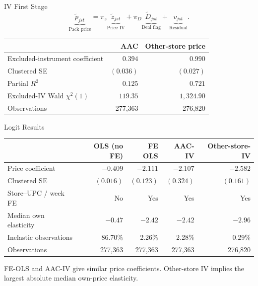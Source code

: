 \documentclass[aspectratio=169,11pt]{beamer}
\begin{document}
\begin{frame}{IV First Stage}
\[\underbrace{\widetilde p_{jst}}_{\text{Pack price}} =
\pi_z\underbrace{\widetilde z_{jst}}_{\text{Price IV}} +
\pi_D\underbrace{\widetilde D_{jst}}_{\text{Deal flag}} +
\underbrace{v_{jst}}_{\text{Residual}}.\]
\small\centering\renewcommand\arraystretch{1.10}
\begin{tabular}{@{}lrr@{}}
\toprule
 & AAC & Other-store price \\
\midrule
Excluded-instrument coefficient & $0.394$ & $0.990$ \\
Clustered SE & $(0.036)$ & $(0.027)$ \\
\midrule
Partial $R^2$ & $0.125$ & $0.721$ \\
Excluded-IV Wald $\chi^2(1)$ & $119.35$ & $1{,}324.90$ \\
Observations & 277,363 & 276,820 \\
\bottomrule
\end{tabular}\par
\end{frame}
\begin{frame}{Logit Results}
\small\centering\renewcommand\arraystretch{1.2}
\begin{tabular}{@{}lrrrr@{}}
\toprule
 & OLS (no FE) & FE OLS & AAC-IV & Other-store-IV \\
\midrule
Price coefficient & $-0.409$ & $-2.111$ & $-2.107$ & $-2.582$ \\
Clustered SE & $(0.016)$ & $(0.123)$ & $(0.324)$ & $(0.161)$ \\
Store--UPC / week FE & No & Yes & Yes & Yes \\
Median own elasticity & $-0.47$ & $-2.42$ & $-2.42$ & $-2.96$ \\
Inelastic observations & 86.70\% & 2.26\% & 2.28\% & 0.29\% \\
Observations & 277,363 & 277,363 & 277,363 & 276,820 \\
\bottomrule
\end{tabular}\par

\par\medskip\raggedright
FE-OLS and AAC-IV give similar price coefficients. Other-store IV implies the largest absolute median own-price elasticity.
\end{frame}
\end{document}
